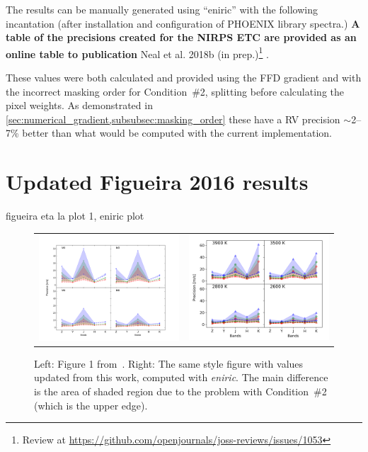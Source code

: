 The results can be manually generated using ``eniric'' with the following incantation (after installation and configuration of {PHOENIX} library spectra.)
\textbf{A table of the precisions created for the {NIRPS} ETC are provided as an online table to  publication} {Neal et al.
2018b (in prep.)}\footnote{Review at \href{https://github.com/openjournals/joss-reviews/issues/1053}{https://github.com/openjournals/joss-reviews/issues/1053}} .


These values were both calculated and provided using the {FFD} gradient and with the incorrect masking order for Condition~\#2, splitting before calculating the pixel weights.
As  demonstrated in \cref{sec:numerical_gradient,subsubsec:masking_order} these have a {RV} precision \(\sim\)2--7\% better than what would be computed with the current implementation.


\section{ Updated Figueira 2016 results}
 figueira eta la plot 1, eniric plot

\begin{figure}
    \centering
    \begin{tabular}{cc}
    \includegraphics[width=0.48\linewidth]{figures/information-content/Rvprec_vsini1.pdf} &  %
    \includegraphics[width=0.47\linewidth]{figures/information-content/precision_fourpanel.png}\\ %
    \end{tabular}
    \caption[Comparision of {RV} precision results to~\citet{figueira_radial_2016}.]{Left: Figure 1 from~\citet{figueira_radial_2016}.
        Right: The same style figure with values updated from this work, computed with \emph{eniric}.
The main difference is the area of shaded region due to the problem with Condition~\#2 (which is the upper edge).}
    \label{fig:my_label}
\end{figure}

